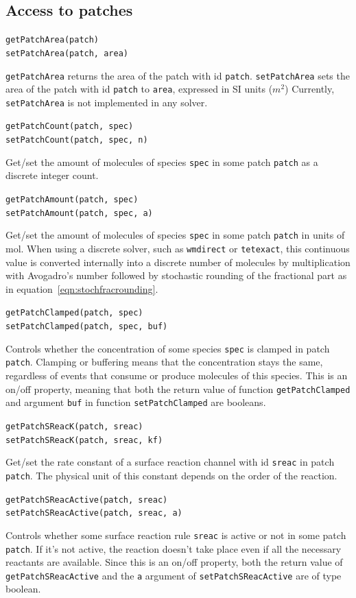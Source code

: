 \documentclass[a4paper,12pt]{book}
\begin{document}
\subsection{Access to patches}
{\setlength{\parskip}{12pt} \setlength{\parindent}{0pt}
\texttt{getPatchArea(patch)}\\
\texttt{setPatchArea(patch, area)}

\texttt{getPatchArea} returns the area of the patch with id \texttt{patch}. \texttt{setPatchArea} sets the area of the patch with id \texttt{patch} to \texttt{area}, expressed in SI units ($m^2$) Currently, \texttt{setPatchArea} is not implemented in any solver.

\texttt{getPatchCount(patch, spec)}\\
\texttt{setPatchCount(patch, spec, n)}

Get/set the amount of molecules of species \texttt{spec} in some patch \texttt{patch} as a discrete integer count.

\texttt{getPatchAmount(patch, spec)} \\
\texttt{setPatchAmount(patch, spec, a)}

Get/set the amount of molecules of species \texttt{spec} in some patch \texttt{patch} in units of mol. When using a discrete solver, such as \texttt{wmdirect} or \texttt{tetexact}, this continuous value is converted internally into a discrete number of molecules by multiplication with Avogadro's number followed by stochastic rounding of the fractional part as in equation~\ref{eqn:stochfracrounding}. 

\texttt{getPatchClamped(patch, spec)} \\
\texttt{setPatchClamped(patch, spec, buf)}

Controls whether the concentration of some species \texttt{spec} is clamped in patch \texttt{patch}. Clamping or buffering means that the concentration stays the same, regardless of events that consume or produce molecules of this species. This is an on/off property, meaning that both the return value of function \texttt{getPatchClamped} and argument \texttt{buf} in function \texttt{setPatchClamped} are booleans.

\texttt{getPatchSReacK(patch, sreac)} \\
\texttt{setPatchSReacK(patch, sreac, kf)}

Get/set the rate constant of a surface reaction channel with id \texttt{sreac} in patch \texttt{patch}. The physical unit of this constant depends on the order of the reaction.

\texttt{getPatchSReacActive(patch, sreac)} \\
\texttt{setPatchSReacActive(patch, sreac, a)}

Controls whether some surface reaction rule \texttt{sreac} is active or not in some patch \texttt{patch}. If it's not active, the reaction doesn't take place even if all the necessary reactants are available. Since this is an on/off property, both the return value of \texttt{getPatchSReacActive} and the \texttt{a} argument of \texttt{setPatchSReacActive} are of type boolean.
}
\end{document}
